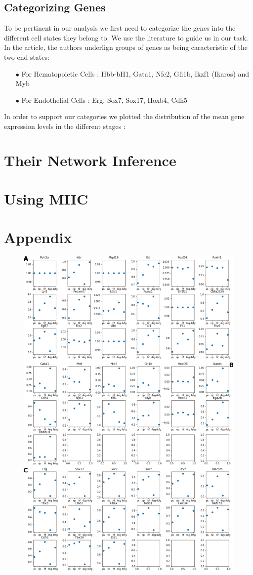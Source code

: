 \documentclass[a4paper,12pt]{book}
\theoremstyle{break}
\begin{document}
\subsection*{Categorizing Genes}
	 To be pertinent in our analysis we first need to categorize the genes into the different cell states they belong to. We use the literature to guide us in our task. In the article, the authors underlign groups of genes as being caracteristic of the two end states:
	\begin{itemize}
		\item[$\bullet$] For Hematopoietic Cells : Hbb-bH1, Gata1, Nfe2, Gfi1b, Ikzf1 (Ikaros) and Myb
		\item[$\bullet$] For Endothelial Cells : Erg, Sox7, Sox17, Hoxb4, Cdh5
		\item[]
	\end{itemize}
	In order to support our categories we plotted the distribution of the mean gene expression levels in the different stages :



\section*{Their Network Inference}
\section*{Using MIIC}
\newpage
\section*{Appendix}
\begin{figure}[h]
	\centering
	\includegraphics*[width = 0.6\linewidth]{../Preliminary/exptot.pdf}
\end{figure}
	
\end{document}
